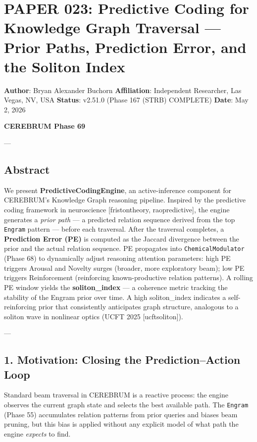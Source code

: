 \section{PAPER 023: Predictive Coding for Knowledge Graph Traversal — Prior Paths, Prediction Error, and the Soliton Index}

\textbf{Author}: Bryan Alexander Buchorn  
\textbf{Affiliation}: Independent Researcher, Las Vegas, NV, USA  
\textbf{Status}: v2.51.0 (Phase 167 (STRB) COMPLETE)
\textbf{Date}: May 2, 2026

\textbf{CEREBRUM Phase 69}

---

\subsection{Abstract}

We present \textbf{PredictiveCodingEngine}, an active-inference component for CEREBRUM's Knowledge Graph reasoning pipeline. Inspired by the predictive coding framework in neuro\-science [friston\-theory, rao\-predi\-ctive], the engine generates a \textit{prior path} — a predicted relation sequence derived from the top \texttt{Engram} pattern — before each traversal. After the traversal completes, a \textbf{Prediction Error (PE)} is computed as the Jaccard divergence between the prior and the actual relation sequence. PE propagates into \texttt{ChemicalModulator} (Phase 68) to dynamically adjust reasoning attention parameters: high PE triggers Arousal and Novelty surges (broader, more exploratory beam); low PE triggers Reinfo\-rcement (reinforcing known-productive relation patterns). A rolling PE window yields the \textbf{soliton\_index} — a coherence metric tracking the stability of the Engram prior over time. A high soliton\_index indicates a self-reinforcing prior that consi\-stently anticipates graph structure, analogous to a soliton wave in nonlinear optics (UCFT 2025 [ucft\-soliton]).

---

\subsection{1. Motivation: Closing the Prediction–Action Loop}

Standard beam traversal in CEREBRUM is a reactive process: the engine observes the current graph state and selects the best available path. The \texttt{Engram} (Phase 55) accumulates relation patterns from prior queries and biases beam pruning, but this bias is applied without any explicit model of what path the engine \textit{expects} to find.

